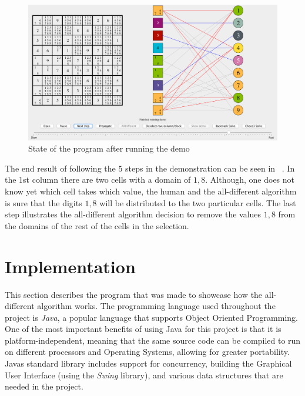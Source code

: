 \documentclass{l4proj}
\begin{document}

\begin{figure}[H]
\centering
\includegraphics[width=14cm]{images/proof_of_concept/screenshot7.png}
\caption{State of the program after running the demo}
\label{screenshot7}
\end{figure}

\noindent The end result of following the $5$ steps in the demonstration can be seen in ~. In the 1st column there are two cells with a domain of ${1, 8}$. Although, one does not know yet which cell takes which value, the human and the all-different algorithm is sure that the digits ${1, 8}$ will be distributed to the two particular cells. The last step illustrates the all-different algorithm decision to remove the values ${1, 8}$ from the domains of the rest of the cells in the selection.

\chapter{Implementation}
\label{chap6implementation}
\noindent This section describes the program that was made to showcase how the all-different algorithm works. The programming language used throughout the project is \textit{Java}, a popular language that supports Object Oriented Programming. One of the most important benefits of using Java for this project is that it is platform-independent, meaning that the same source code can be compiled to run on different processors and Operating Systems, allowing for greater portability. Java\textquotesingle s standard library includes support for concurrency, building the Graphical User Interface (using the \textit{Swing} library), and various data structures that are needed in the project.
\end{document}
